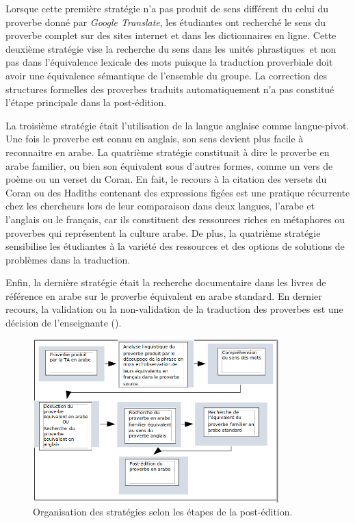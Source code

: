 \documentclass[french]{textolivre}
\begin{document}
Lorsque cette première stratégie n’a pas produit de sens différent du celui du proverbe donné par \textit{Google Translate}, les étudiantes ont recherché le sens du proverbe complet sur des sites internet et dans les dictionnaires en ligne. Cette deuxième stratégie vise la recherche du sens dans les unités phrastiques et non pas dans l’équivalence lexicale des mots puisque la traduction proverbiale doit avoir une équivalence sémantique de l’ensemble du groupe. La correction des structures formelles des proverbes traduits automatiquement n’a pas constitué l’étape principale dans la post-édition.

La troisième stratégie était l’utilisation de la langue anglaise comme langue-pivot. Une fois le proverbe est connu en anglais, son sens devient plus facile à reconnaitre en arabe. La quatrième stratégie constituait à dire le proverbe en arabe familier, ou bien son équivalent sous d’autres formes, comme un vers de poème ou un verset du Coran. En fait, le recours à la citation des versets du Coran ou des Hadiths contenant des expressions figées est une pratique récurrente chez les chercheurs lors de leur comparaison dans deux langues, l’arabe et l’anglais \cite[p.~83]{alhomoud_articulation_2020} ou le français, car ils constituent des ressources riches en métaphores ou proverbes qui représentent la culture arabe. De plus, la quatrième stratégie sensibilise les étudiantes à la variété des ressources et des options de solutions de problèmes dans la traduction.

Enfin, la dernière stratégie était la recherche documentaire dans les livres de référence en arabe sur le proverbe équivalent en arabe standard. En dernier recours, la validation ou la non-validation de la traduction des proverbes est une décision de l’enseignante ().

\begin{figure}[htbp]
 \centering
 \includegraphics[width=0.85\textwidth]{Fig3.png}
 \caption{Organisation des stratégies selon les étapes de la post-édition.}
 \label{fig3}
\end{figure}
\end{document}

